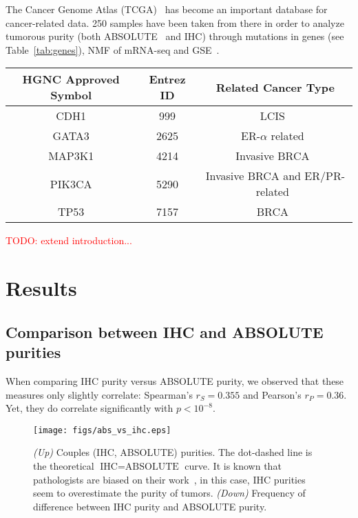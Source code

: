 \documentclass[letterpaper]{article}
\newcommand{\TODO}[1]{\textcolor{red}{TODO: {#1}}}
\begin{document}
The Cancer Genome Atlas (TCGA)~\citep{weinstein2013cancer} has become an important database for cancer-related data. 250 samples have been taken from there in order to
analyze tumorous purity (both ABSOLUTE~\citep{carter2012absolute} and IHC) through mutations in genes (see Table~\ref{tab:genes}), NMF of mRNA-seq
and GSE~\citep{subramanian2005gene}.

\begin{table*}[!t]
\centering
\vspace{-.5cm}
\begin{tabular}{c|c|c}
HGNC Approved Symbol & Entrez ID & Related Cancer Type \\ \hline \hline
CDH1 & 999 & LCIS~\citep{berx1998mutations} \\ \hline
GATA3 & 2625 & ER-$\alpha$ related~\citep{ciocca2009significance} \\ \hline
MAP3K1 & 4214 & Invasive BRCA~\citep{easton2007genome} \\ \hline
PIK3CA & 5290 & Invasive BRCA and ER/PR-related~\citep{saal2005pik3ca} \\ \hline
TP53 & 7157 & BRCA~\citep{gasco2002p53}
\end{tabular}
\caption{Genes considered in this study with both their HGNC symbol which (used further down) and their Entrez ID.\label{tab:genes}}
\end{table*}

\TODO{extend introduction...}

\newpage
\section{Results}
\subsection{Comparison between IHC and ABSOLUTE purities}
When comparing IHC purity versus ABSOLUTE purity, we observed that these measures only slightly correlate: Spearman's $r_S = 0.355$ and Pearson's $r_P = 0.36$.
Yet, they do correlate significantly with $p < 10^{-8}$.

\begin{figure}[!h]
\hspace{-.6cm}
\texttt{[image: figs/abs\_vs\_ihc.eps]}
\vspace{-1cm}
\caption{\textit{(Up)} Couples (IHC, ABSOLUTE) purities. The dot-dashed line is the theoretical $\text{IHC} = \text{ABSOLUTE}$ curve. It is known that pathologists
are biased on their work~\citep{fandel2008we}, in this case, IHC purities seem to overestimate the purity of tumors.
\textit{(Down)} Frequency of difference between IHC purity and ABSOLUTE purity.\label{fig:abs vs ihc}}
\end{figure}
\end{document}
